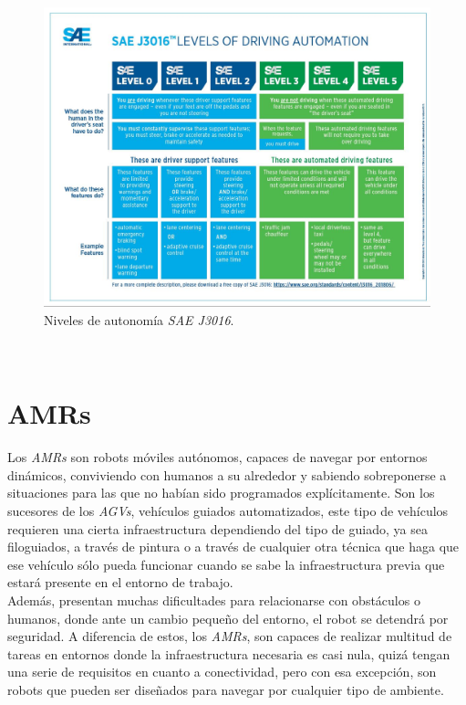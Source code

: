 \begin{figure} [h!]
	\begin{center}
		\includegraphics[width=12cm]{figs/SAEJ3016}
	\end{center}
	\caption{Niveles de autonomía \textit{SAE J3016}.}
	\label{fig:SAEJ3016}
\end{figure}\

\section{AMRs}
\label{sec:amr} %
Los  \textit{AMRs} son robots móviles autónomos, capaces de navegar por entornos dinámicos, conviviendo con humanos a su alrededor y sabiendo sobreponerse a situaciones para las que no habían sido programados explícitamente. Son los sucesores de los  \textit{AGVs}, vehículos guiados automatizados, este tipo de vehículos requieren una cierta infraestructura dependiendo del tipo de guiado, ya sea filoguiados, a través de pintura o a través de cualquier otra técnica que haga que ese vehículo sólo pueda funcionar cuando se sabe la infraestructura previa que estará presente en el entorno de trabajo.\\

Además, presentan muchas dificultades para relacionarse con obstáculos o humanos, donde ante un cambio pequeño del entorno, el robot se detendrá por seguridad. A diferencia de estos, los  \textit{AMRs}, son capaces de realizar multitud de tareas en entornos donde la infraestructura necesaria es casi nula, quizá tengan una serie de requisitos en cuanto a conectividad, pero con esa excepción, son robots que pueden ser diseñados para navegar por cualquier tipo de ambiente.\\

